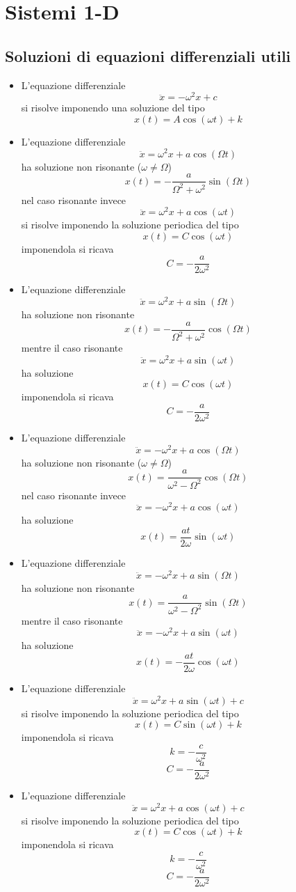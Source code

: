 \documentclass[
10pt, %
a4paper, %
oneside, %
headinclude,footinclude, %
BCOR5mm, %
]{scrartcl}
\begin{document}
\newpage
\appendix
\section{Sistemi 1-D}
\subsection{Soluzioni di equazioni differenziali utili}
\begin{itemize}
	\item L'equazione differenziale 
	\[\ddot{x} = -\omega^2 x + c\]
	si risolve imponendo una soluzione del tipo
	\[x(t) = A\cos(\omega t) + k\]
	\item L'equazione differenziale 
	\[\ddot{x} = \omega^2 x + a\cos(\Omega t)\]
	ha soluzione non risonante ($\omega \neq \Omega$)
	\[x(t) = -\frac{a}{\Omega^2+\omega^2}\sin(\Omega t)\]
	nel caso risonante invece
	\[\ddot{x} = \omega^2 x + a\cos(\omega t)\]
	si risolve imponendo la soluzione periodica del tipo
	\[x(t) = C\cos(\omega t)\]
	imponendola si ricava
	\[C = -\frac{a}{2\omega^2}\]
	\item L'equazione differenziale 
	\[\ddot{x} = \omega^2 x + a\sin(\Omega t)\]
	ha soluzione non risonante 
	\[x(t) = -\frac{a}{\Omega^2 + \omega^2}\cos(\Omega t)\]
	mentre il caso risonante
	\[\ddot{x} = \omega^2 x + a\sin(\omega t)\]
	ha soluzione 
	\[x(t) = C\cos(\omega t)\]
	imponendola si ricava 
	\[C = -\frac{a}{2\omega^2}\]
	
	\item L'equazione differenziale 
	\[\ddot{x} = -\omega^2 x + a\cos(\Omega t)\]
	ha soluzione non risonante ($\omega \neq \Omega$)
	\[x(t) = \frac{a}{\omega^2-\Omega^2}\cos(\Omega t)\]
	nel caso risonante invece
	\[\ddot{x} = -\omega^2 x + a\cos(\omega t)\]
	ha soluzione
	\[x(t) = \frac{a t}{2\omega}\sin(\omega t)\]
	\item L'equazione differenziale 
	\[\ddot{x} = -\omega^2 x + a\sin(\Omega t)\]
	ha soluzione non risonante 
	\[x(t) = \frac{a}{\omega^2 - \Omega^2}\sin(\Omega t)\]
	mentre il caso risonante
	\[\ddot{x} = -\omega^2 x + a\sin(\omega t)\]
	ha soluzione
	\[x(t) = -\frac{at}{2\omega}\cos(\omega t)\]
	
	\item L'equazione differenziale 
	\[\ddot{x} = \omega^2 x + a\sin(\omega t)+c\]
	si risolve imponendo la soluzione periodica del tipo
	\[x(t) = C\sin(\omega t)+k\]
	imponendola si ricava 
	\[k = -\frac{c}{\omega^2}\]
	\[C = -\frac{a}{2\omega^2}\]
	\item L'equazione differenziale 
	\[\ddot{x} = \omega^2 x + a\cos(\omega t)+c\]
	si risolve imponendo la soluzione periodica del tipo
	\[x(t) = C\cos(\omega t)+k\]
	imponendola si ricava 
	\[k = -\frac{c}{\omega^2}\]
	\[C = -\frac{a}{2\omega^2}\]
\end{itemize}
\end{document}
